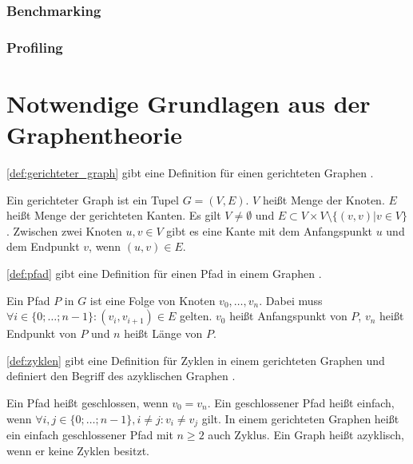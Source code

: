 \subsubsection*{Benchmarking}
\subsubsection*{Profiling}


\section{Notwendige Grundlagen aus der Graphentheorie}
\label{sec:grundlagen_graphentheorie}

\autoref{def:gerichteter_graph} gibt eine Definition für einen gerichteten
Graphen \autocite[vgl.][220]{AlgorithmenUndDatenstrukturen}.
\begin{definition}
    Ein gerichteter Graph ist ein Tupel $G=(V,E)$. $V$ heißt Menge der Knoten.
    $E$ heißt Menge der gerichteten Kanten. Es gilt $V\ne\emptyset$ und $E \subset V \times
    V \setminus \{(v,v) | v \in V\}$. Zwischen zwei Knoten $u,v \in V$ gibt es
    eine Kante mit dem Anfangspunkt $u$ und dem Endpunkt $v$, wenn $(u,v) \in E$.
    \label{def:gerichteter_graph}
\end{definition}

\autoref{def:pfad} gibt eine Definition für einen Pfad in einem Graphen
\autocite[vgl.][221f]{AlgorithmenUndDatenstrukturen}.
\begin{definition}
    Ein Pfad $P$ in $G$  ist eine Folge von Knoten $v_0, \dots ,v_n$. Dabei
    muss $\forall i \in \{0; \dots; n-1 \} : (v_i,v_{i+1}) \in E$ gelten. $v_0$
    heißt Anfangspunkt von $P$, $v_n$ heißt Endpunkt von $P$ und $n$ heißt
    Länge von $P$.
    \label{def:pfad}
\end{definition}

\autoref{def:zyklen} gibt  eine Definition für Zyklen in einem gerichteten
Graphen und definiert den Begriff des azyklischen Graphen
\autocite[vgl.][222]{AlgorithmenUndDatenstrukturen}.
\begin{definition}
    Ein Pfad heißt geschlossen, wenn $v_0 = v_n$. Ein
    geschlossener Pfad heißt einfach, wenn $\forall i,j \in \{0; \dots; n-1\}, i
    \ne j:v_i \ne v_j$ gilt. In einem gerichteten Graphen heißt ein einfach
    geschlossener Pfad mit $n\geq 2$ auch Zyklus. Ein Graph heißt azyklisch,
    wenn er keine Zyklen besitzt.
    \label{def:zyklen}
\end{definition}

